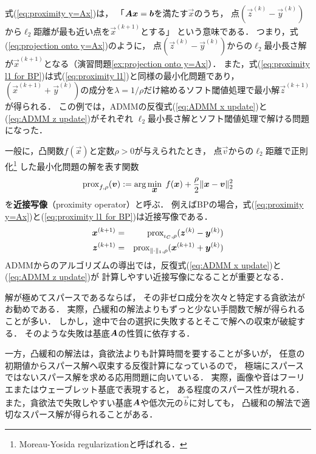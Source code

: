 式(\ref{eq:proximity y=Ax})は，
「$\mbox{\boldmath $A$}\mbox{\boldmath $x$}=\mbox{\boldmath $b$}$を満たす$\vec x$のうち，
点$(\vec z^{(k)}-\vec y^{(k)})$から$\ell_2$距離が最も近い点を$\vec x^{(k+1)}$とする」
という意味である．
つまり，式(\ref{eq:projection onto y=Ax})のように，
点$(\vec z^{(k)}-\vec y^{(k)})$からの$\ell_2$最小長さ解が$\vec x^{(k+1)}$となる（演習問題\ref{ex:projection onto y=Ax}）．
また，式(\ref{eq:proximity l1 for BP})は式(\ref{eq:proximity l1})と同様の最小化問題であり，
$(\vec x^{(k+1)}+\vec y^{(k)})$の成分を$\lambda=1/\rho$だけ縮めるソフト閾値処理で最小解$\vec z^{(k+1)}$が得られる．
この例では，ADMMの反復式(\ref{eq:ADMM x update})と(\ref{eq:ADMM z update})がそれぞれ
$\ell_2$最小長さ解とソフト閾値処理で解ける問題になった．


一般に，凸関数$f(\vec x)$と定数$\rho>0$が与えられたとき，
点$\vec v$からの$\ell_2$距離で正則化\footnote{Moreau-Yosida regularizationと呼ばれる．}
した最小化問題の解を表す関数
\begin{equation}
 \mathop{\textrm{prox}}\nolimits_{f,\rho}(\mbox{\boldmath $v$}):=\arg\min_{\mbox{\boldmath $x$}}\; f(\mbox{\boldmath $x$})+\frac{\rho}{2}\|\mbox{\boldmath $x$}-\mbox{\boldmath $v$}\|_2^2
\end{equation}
を{\bf 近接写像}（proximity operator）と呼ぶ．
例えばBPの場合，式(\ref{eq:proximity y=Ax})と(\ref{eq:proximity l1 for BP})は近接写像である．
\begin{eqnarray}
\mbox{\boldmath $x$}^{(k+1)} &=& \mathop{\textrm{prox}}\nolimits_{\iota_C,\rho}(\mbox{\boldmath $z$}^{(k)}-\mbox{\boldmath $y$}^{(k)})\\
\mbox{\boldmath $z$}^{(k+1)} &=& \mathop{\textrm{prox}}\nolimits_{\|\cdot\|_1,\rho}(\mbox{\boldmath $x$}^{(k+1)}+\mbox{\boldmath $y$}^{(k)})
\end{eqnarray}
ADMMからのアルゴリズムの導出では，反復式(\ref{eq:ADMM x update})と(\ref{eq:ADMM z update})が
計算しやすい近接写像になることが重要となる．






解が極めてスパースであるならば，
その非ゼロ成分を次々と特定する貪欲法がお勧めである．
実際，凸緩和の解法よりもずっと少ない手間数で解が得られることが多い．
しかし，途中で台の選択に失敗するとそこで解への収束が破綻する．
そのような失敗は基底$\mbox{\boldmath $A$}$の性質に依存する．

一方，凸緩和の解法は，貪欲法よりも計算時間を要することが多いが，
任意の初期値からスパース解へ収束する反復計算になっているので，
極端にスパースではないスパース解を求める応用問題に向いている．
実際，画像や音はフーリエまたはウェーブレット基底で表現すると，
ある程度のスパース性が現れる．
また，貪欲法で失敗しやすい基底$\mbox{\boldmath $A$}$や低次元の$\vec b$に対しても，
凸緩和の解法で適切なスパース解が得られることがある．

